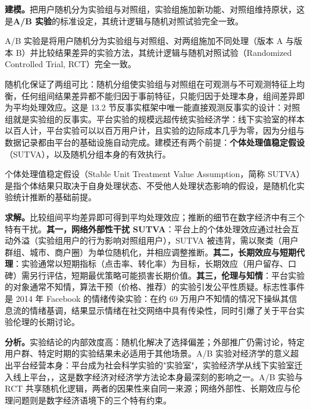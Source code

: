 \textbf{建模。}把用户随机分为实验组与对照组，实验组施加新功能、对照组维持原状，这是\textbf{A/B 实验}的标准设定，其统计逻辑与随机对照试验完全一致。

\begin{definition}[A/B 实验（A/B Testing）]
A/B 实验是将用户随机分为实验组与对照组、对两组施加不同处理（版本 A 与版本 B）并比较结果差异的实验方法，其统计逻辑与随机对照试验（Randomized Controlled Trial, RCT）完全一致。
\end{definition}

随机化保证了两组可比：随机分组使实验组与对照组在可观测与不可观测特征上均衡，任何组间结果差异都不能归因于事前特征，只能归因于处理本身，组间差异即为平均处理效应。这是 13.2 节反事实框架中唯一能直接观测反事实的设计：对照组就是实验组的反事实。平台实验的规模远超传统实验经济学：线下实验室的样本以百人计，平台实验可以以百万用户计，且实验的边际成本几乎为零，因为分组与数据记录都由平台的基础设施自动完成。建模还有两个前提：\textbf{个体处理值稳定假设}（SUTVA），以及随机分组本身的有效执行。

\begin{definition}
个体处理值稳定假设（Stable Unit Treatment Value Assumption，简称 SUTVA）是指个体结果只取决于自身处理状态、不受他人处理状态影响的假设，是随机化实验统计推断的基础前提。
\end{definition}

\textbf{求解。}比较组间平均差异即可得到平均处理效应；推断的细节在数字经济中有三个特有干扰。\textbf{其一，网络外部性干扰 SUTVA}：平台上的个体处理效应通过社会互动外溢（实验组用户的行为影响对照组用户），SUTVA 被违背，需以聚类（用户群组、城市、商户圈）为单位随机化，并相应调整推断。\textbf{其二，长期效应与短期代理}：实验通常以短期指标（点击率、转化率）为目标，长期效应（用户留存、口碑）需另行评估，短期最优策略可能损害长期价值。\textbf{其三，伦理与知情}：平台实验的对象通常不知情，算法干预（价格、推荐）的实验引发公平性质疑。标志性事件是 2014 年 Facebook 的情绪传染实验：在约 69 万用户不知情的情况下操纵其信息流的情绪基调，结果显示情绪在社交网络中具有传染性，同时引爆了关于平台实验伦理的长期讨论。

\textbf{分析。}实验结论的内部效度高：随机化解决了选择偏差；外部推广仍需讨论，特定用户群、特定时期的实验结果未必适用于其他场景。A/B 实验对经济学的意义超出平台经营本身：平台成为社会科学实验的"实验室"，实验经济学从线下实验室迁入线上平台，，这是数字经济对经济学方法论本身最深刻的影响之一。A/B 实验与 RCT 共享随机化逻辑，两者的因果性来自同一来源；网络外部性、长期效应与伦理问题则是数字经济语境下的三个特有约束。

